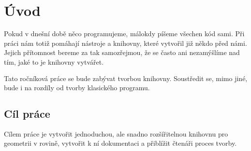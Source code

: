 \chapter{Úvod}
\label{chap:introduction}

Pokud v dnešní době něco programujeme, málokdy píšeme všechen kód sami. 
Při práci nám totiž pomáhají nástroje a knihovny, které vytvořil již někdo před námi.
Jejich přítomnost bereme za tak samozřejmou, že se často ani nezamýšlíme nad tím, jaké to je knihovny vytvářet.  

Tato ročníková práce se bude zabývat tvorbou knihovny. Soustředit se, mimo jiné, bude i na rozdíly od tvorby klasického programu.

\section{Cíl práce}
\label{sec:goal}

Cílem práce je vytvořit jednoduchou, ale snadno rozšířitelnou knihovnu pro geometrii v rovině, vytvořit k ní dokumentaci a přiblížit čtenáři proces tvorby. 